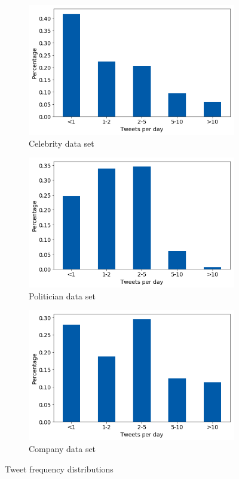 \begin{figure}[h]
\begin{subfigure}{.33\textwidth}
  \includegraphics[width=.95\linewidth]{img/celeb_freq_distr}
  \caption{Celebrity data set}
  \label{fig:freq_distr_sub1}
\end{subfigure}%
\begin{subfigure}{.33\textwidth}
  \includegraphics[width=.95\linewidth]{img/polit_freq_distr}
  \caption{Politician data set}
  \label{fig:freq_distr_sub2}
\end{subfigure}
\begin{subfigure}{.33\textwidth}
  \includegraphics[width=.95\linewidth]{img/corp_freq_distr}
  \caption{Company data set}
  \label{fig:freq_distr_sub3}
\end{subfigure}%
\caption{Tweet frequency distributions}
\label{fig:freq_distr}
\end{figure}

